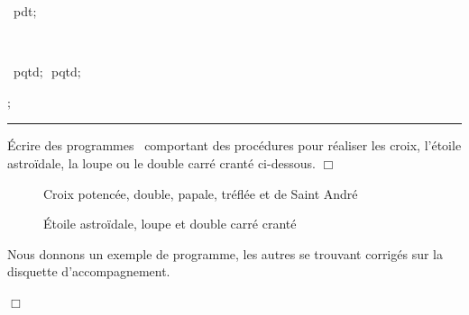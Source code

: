 \pagebreak[3] 
\vspace{\neglskip}\mbox{\blc  {}\ pdt$;$}\par 
\vspace{\neglskip}\mbox{\blc  \ }\par 
\vspace{\neglskip}\mbox{\blc  {}}\par 
\vspace{\neglskip}\mbox{\blc  \ \idt  pqtd$;$\ pqtd$;$\ }\par 
\vspace{\neglskip}\mbox{\blc  {}$;$}\par 
\medskip

\noindent\rule{137mm}{0.1mm} %
\begin{exercices}{
Écrire des programmes \pascal\ comportant des pro\-cé\-du\-res pour 
réaliser les croix,
l'étoile astroïdale, la loupe ou le double carré cranté
ci-dessous.
\noindent $\Box$}\end{exercices}
\begin{figure}[htbp]
 \vspace{-\baselineskip}
 \caption{Croix potencée, double, papale, tréflée et de Saint André}
\end{figure}
\begin{figure}[htbp]
 \caption{Étoile astroïdale, loupe et double carré cranté}
\end{figure}

\clearpage

\begin{corrige}{
Nous donnons un exemple de programme, les
autres se trouvant corrigés sur la disquette d'accompagnement.

\noindent $\Box$}\end{corrige}


